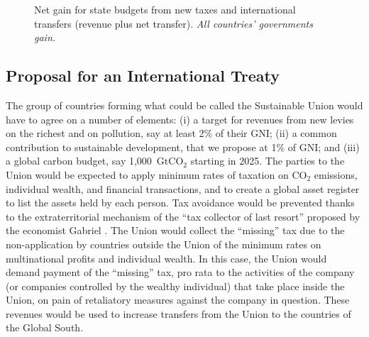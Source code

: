 \documentclass[12pt,english]{article}
\begin{document}
\begin{bibunit}
\begin{figure}[h!] 
    \caption{Net gain for state budgets from new taxes and international transfers (revenue plus net transfer). \textit{All countries' governments gain. }}\label{fig:budget_gain_both_taxes}
\end{figure}

\subsection*{Proposal for an International Treaty}
The group of countries forming what could be called the Sustainable Union would have to agree on a number of elements: (i) a target for revenues from new levies on the richest and on pollution, say at least 2\% of their GNI; (ii) a common contribution to sustainable development, that we propose at 1\% of GNI; and (iii) a global carbon budget, say 1,000~GtCO$_\text{2}$ starting in 2025.
The parties to the Union would be expected to apply minimum rates of taxation on CO$_\text{2}$ emissions, individual wealth, and financial transactions, and to create a global asset register to list the assets held by each person. Tax avoidance would be prevented thanks to the extraterritorial mechanism of the ``tax collector of last resort'' proposed by the economist Gabriel \cite{zucman_blueprint_2024}. The Union would collect the ``missing'' tax due to the non-application by countries outside the Union of the minimum rates on multinational profits and individual wealth. In this case, the Union would demand payment of the “missing” tax, pro rata to the activities of the company (or companies controlled by the wealthy individual) that take place inside the Union, on pain of retaliatory measures against the company in question. These revenues would be used to increase transfers from the Union to the countries of the Global South.  


\end{bibunit}
\end{document}
